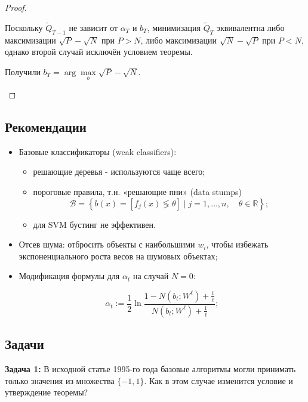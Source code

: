 \begin{proof}
\begin{enumerate}[1)]
              Поскольку $\widetilde{Q}_{T-1}$ не зависит от $\alpha_T$ и $b_T$, минимизация $\widetilde{Q}_T$ эквивалентна либо максимизации $\sqrt{P}-\sqrt{N}$ при $P>N$, либо максимизации $\sqrt{N}-\sqrt{P}$ при $P<N$, однако второй случай исключён условием теоремы.

              Получили $b_T=\arg \max\limits_{b} \sqrt{P}-\sqrt{N}$. \qedhere
    \end{enumerate}
\end{proof}

\subsection*{Рекомендации}
\begin{itemize}
    \item Базовые классификаторы (weak classifiers):
          \begin{itemize}
              \item решающие деревья - используются чаще всего;
              \item пороговые правила, т.н. «решающие пни» (data stumps)
                    \begin{equation*}
                        \mathscr{B}=\left\{b(x)=\left[f_j(x) \lessgtr \theta\right] \mid j=1, \ldots, n,\quad \theta \in \mathbb{R}\right\};
                    \end{equation*}
              \item для SVM бустинг не эффективен.
          \end{itemize}
    \item Отсев шума: отбросить объекты с наибольшими $w_i$, чтобы избежать экспоненциального роста весов на шумовых объектах;
    \item Модификация формулы для $\alpha_t$ на случай $N=0$:

          \begin{equation*}
              \alpha_t:=\frac{1}{2} \ln \frac{1-N\left(b_t ; W^{\ell}\right)+\frac{1}{\ell}}{N\left(b_t ; W^{\ell}\right)+\frac{1}{\ell}} ;
          \end{equation*}
\end{itemize}

\subsection*{Задачи}
\textbf{Задача 1:} В исходной статье 1995-го года базовые алгоритмы могли принимать только значения из множества $\{-1, 1\}$. Как в этом случае изменится условие и утверждение теоремы?

